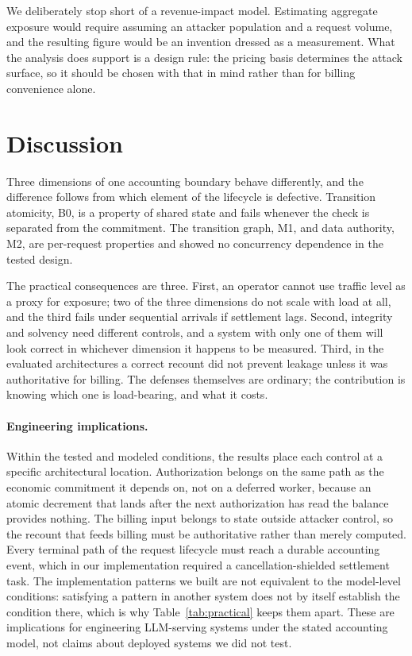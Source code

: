 \documentclass[preprint,3p,authoryear,12pt]{elsarticle}
\begin{document}
We deliberately stop short of a revenue-impact model. Estimating aggregate exposure
would require assuming an attacker population and a request volume, and the resulting
figure would be an invention dressed as a measurement. What the analysis does support is
a design rule: the pricing basis determines the attack surface, so it should be chosen
with that in mind rather than for billing convenience alone.

\section{Discussion}
\label{sec:discussion}
Three dimensions of one accounting boundary behave differently, and the difference
follows from which element of the lifecycle is defective. Transition atomicity, B0, is a
property of shared state and fails whenever the check is separated from the commitment.
The transition graph, M1, and data authority, M2, are per-request properties and showed
no concurrency dependence in the tested design.

The practical consequences are three. First, an operator cannot use traffic level as a
proxy for exposure; two of the three dimensions do not scale with load at all, and the
third fails under sequential arrivals if settlement lags. Second, integrity and solvency
need different controls, and a system with only one of them will look correct in
whichever dimension it happens to be measured. Third, in the evaluated architectures a
correct recount did not prevent leakage unless it was authoritative for billing. The
defenses themselves are ordinary; the contribution is knowing which one is load-bearing,
and what it costs.

\paragraph{Engineering implications.}
Within the tested and modeled conditions, the results place each control at a specific
architectural location. Authorization belongs on the same path as the economic
commitment it depends on, not on a deferred worker, because an atomic decrement that
lands after the next authorization has read the balance provides nothing. The billing
input belongs to state outside attacker control, so the recount that feeds billing must be
authoritative rather than merely computed. Every terminal path of the request lifecycle
must reach a durable accounting event, which in our implementation required a
cancellation-shielded settlement task. The implementation patterns we built are not
equivalent to the model-level conditions: satisfying a pattern in another system does not
by itself establish the condition there, which is why Table~\ref{tab:practical} keeps them
apart. These are implications for engineering LLM-serving systems under the stated
accounting model, not claims about deployed systems we did not test.
\end{document}
